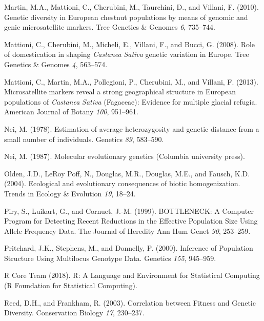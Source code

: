 \documentclass[12pt,a4paper,]{report}
\begin{document}
\leavevmode\hypertarget{ref-martin_genetic_2010}{}%
Martin, M.A., Mattioni, C., Cherubini, M., Taurchini, D., and Villani,
F. (2010). Genetic diversity in European chestnut populations by means
of genomic and genic microsatellite markers. Tree Genetics \& Genomes
\emph{6}, 735--744.

\leavevmode\hypertarget{ref-Mattioni2008}{}%
Mattioni, C., Cherubini, M., Micheli, E., Villani, F., and Bucci, G.
(2008). Role of domestication in shaping \emph{Castanea} \emph{Sativa}
genetic variation in Europe. Tree Genetics \& Genomes \emph{4},
563--574.

\leavevmode\hypertarget{ref-Mattioni2013}{}%
Mattioni, C., Martin, M.A., Pollegioni, P., Cherubini, M., and Villani,
F. (2013). Microsatellite markers reveal a strong geographical structure
in European populations of \emph{Castanea} \emph{Sativa} (Fagaceae):
Evidence for multiple glacial refugia. American Journal of Botany
\emph{100}, 951--961.

\leavevmode\hypertarget{ref-Nei1978}{}%
Nei, M. (1978). Estimation of average heterozygosity and genetic
distance from a small number of individuals. Genetics \emph{89},
583--590.

\leavevmode\hypertarget{ref-nei1987molecular}{}%
Nei, M. (1987). Molecular evolutionary genetics (Columbia university
press).

\leavevmode\hypertarget{ref-olden_ecological_2004}{}%
Olden, J.D., LeRoy Poff, N., Douglas, M.R., Douglas, M.E., and Fausch,
K.D. (2004). Ecological and evolutionary consequences of biotic
homogenization. Trends in Ecology \& Evolution \emph{19}, 18--24.

\leavevmode\hypertarget{ref-Piry1999}{}%
Piry, S., Luikart, G., and Cornuet, J.-M. (1999). BOTTLENECK: A Computer
Program for Detecting Recent Reductions in the Effective Population Size
Using Allele Frequency Data. The Journal of Heredity Ann Hum Genet
\emph{90}, 253--259.

\leavevmode\hypertarget{ref-pritchard_inference_2000}{}%
Pritchard, J.K., Stephens, M., and Donnelly, P. (2000). Inference of
Population Structure Using Multilocus Genotype Data. Genetics
\emph{155}, 945--959.

\leavevmode\hypertarget{ref-RCoreTeam2018}{}%
R Core Team (2018). R: A Language and Environment for Statistical
Computing (R Foundation for Statistical Computing).

\leavevmode\hypertarget{ref-Reed2003}{}%
Reed, D.H., and Frankham, R. (2003). Correlation between Fitness and
Genetic Diversity. Conservation Biology \emph{17}, 230--237.
\end{document}
